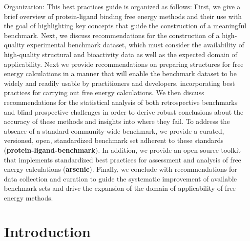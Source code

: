\documentclass[9pt,bestpractices,pubversion]{livecoms}
\begin{document}
\underline{Organization:} 
This best practices guide is organized as follows:
First, we give a brief overview of protein-ligand binding free energy methods and their use with the goal of highlighting key concepts that guide the construction of a meaningful benchmark.
Next, we discuss recommendations for the construction of a high-quality experimental benchmark dataset, which must consider the availability of high-quality structural and bioactivity data as well as the expected domain of applicability.
Next we provide recommendations on preparing structures for free energy calculations in a manner that will enable the benchmark dataset to be widely and readily usable by practitioners and developers, incorporating best practices for carrying out free energy calculations.
We then discuss recommendations for the statistical analysis of both retrospective benchmarks and blind prospective challenges in order to derive robust conclusions about the accuracy of these methods and insights into where they fail.
To address the absence of a standard community-wide benchmark, we provide a curated, versioned, open, standardized benchmark set adherent to these standards ({\bf protein-ligand-benchmark}). In addition, we provide an open source toolkit that implements standardized best practices for assessment and analysis of free energy calculations ({\bf arsenic}).
Finally, we conclude with recommendations for data collection and curation to guide the systematic improvement of available benchmark sets and  drive the expansion of the domain of applicability of free energy methods.

\section{Introduction}
\label{sec:intro}
\end{document}
